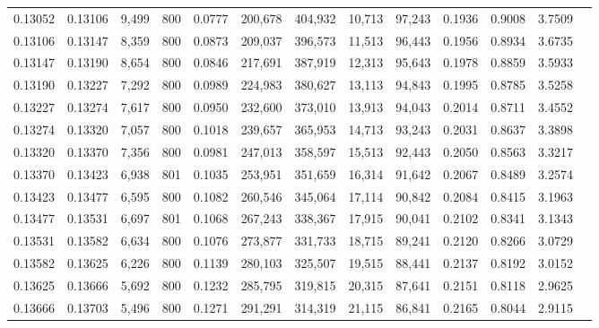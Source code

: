 \begin{tabular}{rrrrrrrrrrrrr}
0.13052 & 0.13106 &  9,499 &   800 &                                     0.0777 & 200,678 & 404,932 &  10,713 &  97,243 & 0.1936 & 0.9008 & 3.7509 \\
0.13106 & 0.13147 &  8,359 &   800 &                                     0.0873 & 209,037 & 396,573 &  11,513 &  96,443 & 0.1956 & 0.8934 & 3.6735 \\
0.13147 & 0.13190 &  8,654 &   800 &                                     0.0846 & 217,691 & 387,919 &  12,313 &  95,643 & 0.1978 & 0.8859 & 3.5933 \\
0.13190 & 0.13227 &  7,292 &   800 &                                     0.0989 & 224,983 & 380,627 &  13,113 &  94,843 & 0.1995 & 0.8785 & 3.5258 \\
0.13227 & 0.13274 &  7,617 &   800 &                                     0.0950 & 232,600 & 373,010 &  13,913 &  94,043 & 0.2014 & 0.8711 & 3.4552 \\
0.13274 & 0.13320 &  7,057 &   800 &                                     0.1018 & 239,657 & 365,953 &  14,713 &  93,243 & 0.2031 & 0.8637 & 3.3898 \\
0.13320 & 0.13370 &  7,356 &   800 &                                     0.0981 & 247,013 & 358,597 &  15,513 &  92,443 & 0.2050 & 0.8563 & 3.3217 \\
0.13370 & 0.13423 &  6,938 &   801 &                                     0.1035 & 253,951 & 351,659 &  16,314 &  91,642 & 0.2067 & 0.8489 & 3.2574 \\
0.13423 & 0.13477 &  6,595 &   800 &                                     0.1082 & 260,546 & 345,064 &  17,114 &  90,842 & 0.2084 & 0.8415 & 3.1963 \\
0.13477 & 0.13531 &  6,697 &   801 &                                     0.1068 & 267,243 & 338,367 &  17,915 &  90,041 & 0.2102 & 0.8341 & 3.1343 \\
0.13531 & 0.13582 &  6,634 &   800 &                                     0.1076 & 273,877 & 331,733 &  18,715 &  89,241 & 0.2120 & 0.8266 & 3.0729 \\
0.13582 & 0.13625 &  6,226 &   800 &                                     0.1139 & 280,103 & 325,507 &  19,515 &  88,441 & 0.2137 & 0.8192 & 3.0152 \\
0.13625 & 0.13666 &  5,692 &   800 &                                     0.1232 & 285,795 & 319,815 &  20,315 &  87,641 & 0.2151 & 0.8118 & 2.9625 \\
0.13666 & 0.13703 &  5,496 &   800 &                                     0.1271 & 291,291 & 314,319 &  21,115 &  86,841 & 0.2165 & 0.8044 & 2.9115 \\

\end{tabular}
